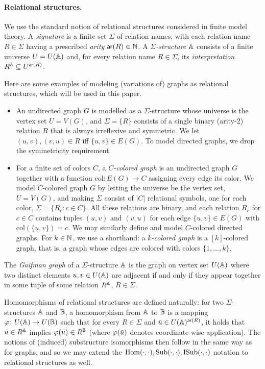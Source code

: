 \paragraph*{Relational structures.} We use the standard notion of relational structures considered in finite model theory. A \emph{signature} is a finite set $\Sigma$ of relation names, with each relation name $R\in \Sigma$ having a prescribed \emph{arity} $\mathsf{ar}(R)\in \mathbb{N}$. A \emph{$\Sigma$-structure} $\mathbb{A}$ consists of a finite universe $U=U(\mathbb{A})$ and, for every relation name $R\in \Sigma$, its \emph{interpretation} $R^{\mathbb{A}}\subseteq U^{\mathsf{ar}(R)}$. 

Here are some examples of modeling (variations of) graphs as relational structures, which will be used in this paper.
\begin{itemize}
	\item An undirected graph $G$ is modelled as a $\Sigma$-structure whose universe is the vertex set $U=V(G)$, and $\Sigma=\{ R \}$ consists of a single binary (arity-$2$) relation $R$ that is always irreflexive and symmetric. We let $(u,v),(v,u) \in R$ iff $\{u,v\} \in E(G)$.  To model directed graphs, we drop the symmetricity requirement.
	\item For a finite set of colors $C$, a \emph{$C$-colored graph} is an undirected graph $G$ together with a function $\mathrm{col}\colon E(G)\to C$ assigning every edge its color. We model $C$-colored graph $G$ by letting the universe be the vertex set, $U=V(G)$, and making $\Sigma$ consist of $|C|$ relational symbols, one for each color, $\Sigma = \{ R_c  \colon c \in C\}$.
	 All these relations are binary, and each relation $R_c$ for $c \in C$ contains tuples $(u,v)$ and $(v,u)$ for each edge $\{ u,v \} \in E(G)$ with $\mathrm{col}(\{ u,v \})=c$.
	 We may similarly define and model $C$-colored directed graphs.
	 For $k\in \mathbb{N}$, we use a shorthand: a \emph{$k$-colored graph} is a $[k]$-colored graph, that is, a graph whose edges are colored with colors $\{1,\ldots,k\}$.
\end{itemize}

The \emph{Gaifman graph} of a $\Sigma$-structure $\mathbb{A}$ is the graph on vertex set $U(\mathbb{A})$ where two distinct elements $u,v\in U(\mathbb{A})$ are adjacent if and only if they appear together in some tuple of some relation $R^{\mathbb{A}}$, $R\in \Sigma$.

Homomorphisms of relational structures are defined naturally: for two $\Sigma$-structures $\mathbb{A}$ and $\mathbb{B}$, a homomorphism from $\mathbb{A}$ to $\mathbb{B}$ is a mapping $\varphi\colon U(\mathbb{A})\to U(\mathbb{B})$ such that for every $R\in \Sigma$ and ${\bar{u}}\in U(\mathbb{A})^{\mathsf{ar}(R)}$, it holds that ${\bar{u}}\in R^{\mathbb{A}}$ implies $\varphi({\bar{u}})\in R^{\mathbb{B}}$ (where $\varphi({\bar{u}})$ denotes coordinate-wise application). The notions of (induced) substructure isomorphisms then follow in the same way as for graphs, and so we may extend the $\mathrm{Hom}(\cdot,\cdot),\mathrm{Sub}(\cdot,\cdot),\mathrm{ISub}(\cdot,\cdot)$ notation to relational structures as well.

